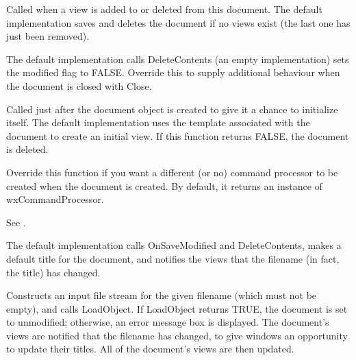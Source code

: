 
Called when a view is added to or deleted from this document. The default
implementation saves and deletes the document if no views exist (the last
one has just been removed).



The default implementation calls DeleteContents (an empty implementation)
sets the modified flag to FALSE. Override this to
supply additional behaviour when the document is closed with Close.



Called just after the document object is created to give it a chance
to initialize itself. The default implementation uses the
template associated with the document to create an initial view.
If this function returns FALSE, the document is deleted.



Override this function if you want a different (or no) command processor
to be created when the document is created. By default, it returns
an instance of wxCommandProcessor.

See .



The default implementation calls OnSaveModified and DeleteContents, makes a default title for the
document, and notifies the views that the filename (in fact, the title) has changed.



Constructs an input file stream for the given filename (which must not be empty),
and calls LoadObject. If LoadObject returns TRUE, the document is set to
unmodified; otherwise, an error message box is displayed. The document's
views are notified that the filename has changed, to give windows an opportunity
to update their titles. All of the document's views are then updated.

